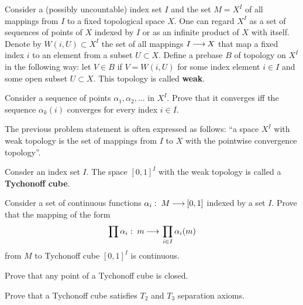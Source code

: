 \documentclass[12pt]{article}
\begin{document}

\begin{opredelenie}
  Consider a (possibly uncountable) index set $I$ and the set $M=X^I$
  of all mappings from $I$ to a fixed topological space $X$. One can
  regard $X^I$ as a set of sequences of points of $X$ indexed by $I$
  or as an infinite product of $X$ with itself. Denote by $W(i, U)\subset
  X^I$ the set of all mappings $I{\:\longrightarrow\:} X$ that map a fixed index $i$
  to an element from a subset $U\subset X$. Define a prebase $B$ of
  topology on $X^I$ in the following way: let $V\in B$ if $V=W(i, U)$
  for some index element $i\in I$ and some open subset $U\subset
  X$. This topology is called {\bf weak}.
\end{opredelenie}

\begin{zadacha}[!]
Consider a sequence of points $\alpha_1, \alpha_2, \dots $ in
$X^I$. Prove that it converges iff the sequence $\alpha_k(i)$
converges for every index $i\in I$.
\end{zadacha}

\begin{zamechanie}
  The previous problem statement is often expressed as follows: ``a
  space $X^I$ with weak topology is the set of mappings from $I$ to $X$
  with the pointwise convergence topology''.
\end{zamechanie}

\begin{opredelenie}
Consder an index set $I$.  The space  $[0,1]^I$ with the weak topology
is called a {\bf Tychonoff cube}.
\end{opredelenie}

\begin{zadacha} 
Consider a set of continuous functions $\alpha_i:\; M {\:\longrightarrow\:} [0,1]$
indexed by a set $I$.  Prove that the mapping of the form
\[ 
\prod \alpha_i:\; m {\:\longrightarrow\:} \prod_{i\in I}\alpha_i(m)
\]
from $M$ to Tychonoff cube $[0,1]^I$ is continuous. 
\end{zadacha}

\begin{zadacha} 
Prove that any point of a Tychonoff cube is closed.
\end{zadacha}

\begin{zadacha}[*]
Prove that a Tychonoff cube satisfies $T_2$ and $T_3$ separation axioms.
\end{zadacha}
\end{document}
